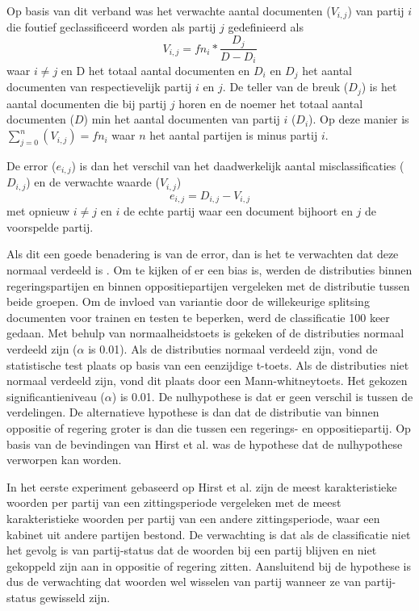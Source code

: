 Op basis van dit verband was het verwachte aantal documenten ($V_{i,j}$) van partij $i$ die foutief geclassificeerd worden als partij $j$ gedefinieerd als
\begin{equation}
\label{eq:expected}
V_{i,j}  = fn_i *  \frac{D_{j}}{D-D_{i}}
\end{equation}
waar $i\neq j$ en D het totaal aantal documenten en $D_i$ en $D_j$ het aantal documenten van respectievelijk partij $i$ en $j$. De teller van de breuk ($D_j$) is het aantal documenten die bij partij $j$ horen en de noemer het totaal aantal documenten ($D$) min het aantal documenten van partij $i$ ($D_i$). Op deze manier is $\sum_{j=0}^{n} (V_{i,j}) = fn_i$ waar $n$ het aantal partijen is minus partij $i$.\par
De error ($e_{i,j}$) is dan het verschil van  het daadwerkelijk aantal misclassificaties ($D_{i,j}$) en de verwachte waarde ($V_{i,j}$)
\begin{equation}
\label{eq:error}
e_{i,j} = D_{i,j} - V_{i,j}
\end{equation}
met opnieuw $i\neq j$ en $i$ de echte partij waar een document bijhoort en $j$ de voorspelde partij. \par
Als dit een goede benadering is van de error, dan is het te verwachten dat deze normaal verdeeld is \cite{citeulike:7531484}. Om te kijken of er een bias is, werden de distributies binnen regeringspartijen en binnen oppositiepartijen vergeleken met de distributie tussen beide groepen. Om de invloed van variantie door de willekeurige splitsing documenten voor trainen en testen te beperken, werd de classificatie 100 keer gedaan. Met behulp van normaalheidstoets is gekeken of de distributies normaal verdeeld zijn ($\alpha$ is 0.01). Als de distributies normaal verdeeld zijn, vond de statistische test plaats op basis van een eenzijdige t-toets. Als de distributies niet normaal verdeeld zijn, vond dit plaats door een Mann-whitneytoets. Het gekozen significantieniveau ($\alpha$) is 0.01. De nulhypothese is dat er geen verschil is tussen de verdelingen. De alternatieve hypothese is dan dat de distributie van binnen oppositie of regering groter is dan die tussen een regerings- en oppositiepartij. Op basis van de bevindingen van Hirst et al. was de hypothese dat de nulhypothese verworpen kan worden.\par
In het eerste experiment gebaseerd op Hirst et al. zijn de meest karakteristieke woorden per partij van een zittingsperiode vergeleken met de meest karakteristieke woorden per partij van een andere zittingsperiode, waar een kabinet uit andere partijen bestond. De verwachting is dat als de classificatie niet het gevolg is van partij-status dat de woorden bij een partij blijven en niet gekoppeld zijn aan in oppositie of regering zitten. Aansluitend bij de hypothese is dus de verwachting dat woorden wel wisselen van partij wanneer ze van partij-status gewisseld zijn.\par
